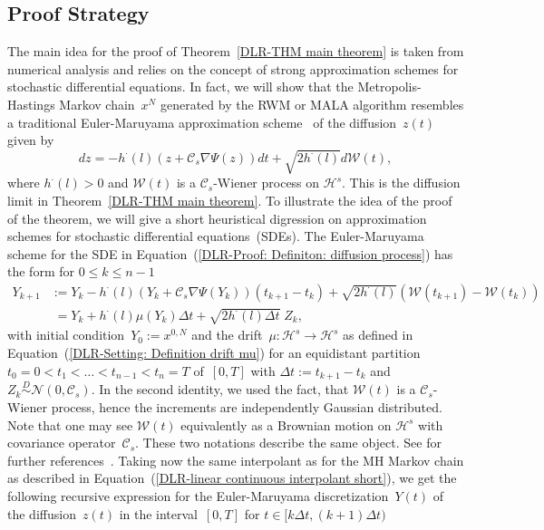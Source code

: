 \subsection{Proof Strategy}
\label{sec:sub:DLR-Proof strategy}


The main idea for the proof of Theorem~\ref{DLR-THM main theorem} is taken from numerical analysis and relies on the concept of strong approximation schemes for stochastic differential equations. In fact, we will show that the Metropolis-Hastings Markov chain~$x^N$ generated by the RWM or MALA algorithm resembles a traditional Euler-Maruyama approximation scheme~\autocite{Kloeden1992} of the diffusion~$z(t)$ given by
 \begin{equation}
 \label{DLR-Proof: Definiton: diffusion process}
  dz = -h^{\cdot}(l) (z + \mathcal{C}_s \nabla \Psi(z)) dt + \sqrt{2 h^{\cdot}(l)} d\mathcal{W}(t),
 \end{equation}
where $h^{\cdot}(l) > 0$ and $\mathcal{W}(t)$ is a $\mathcal{C}_s$-Wiener process on $\mathcal{H}^s$. This is the diffusion limit in Theorem~\ref{DLR-THM main theorem}. To illustrate the idea of the proof of the theorem, we will give a short heuristical digression on approximation schemes for stochastic differential equations~(SDEs). The Euler-Maruyama scheme for the SDE in Equation~(\ref{DLR-Proof: Definiton: diffusion process}) has the form for $0 \leq k \leq n-1$
\begin{equation}
\label{DLR-Proof: Definition Euler-Maruyama scheme of limit SDE}
\begin{split}
  Y_{k+1} & := Y_k - h^{\cdot}(l) (Y_k + \mathcal{C}_s \nabla \Psi(Y_k)) (t_{k+1} - t_k) + \sqrt{2 h^{\cdot}(l)} (\mathcal{W}(t_{k+1}) - \mathcal{W}({t_k})) \\
  & \; = Y_k + h^{\cdot}(l) \mu(Y_k) \Delta t + \sqrt{2 h^{\cdot}(l) \Delta t} \; Z_k,
\end{split}
\end{equation}
with initial condition~$Y_0 := x^{0,N}$ and the drift~$\mu: \mathcal{H}^s \to \mathcal{H}^s$ as defined in Equation~(\ref{DLR-Setting: Definition drift mu}) for an equidistant partition~$t_0 =0 < t_1 < \dots < t_{n-1} < t_n = T $ of~$[0,T]$ with $\Delta t := t_{k+1} - t_k$ and $Z_k \stackrel{D}{\sim} \mathcal{N}(0, \mathcal{C}_s)$. In the second identity, we used the fact, that $\mathcal{W}(t)$ is a $\mathcal{C}_s$-Wiener process, hence the increments are independently Gaussian distributed. Note that one may see $\mathcal{W}(t)$ equivalently as a Brownian motion on $\mathcal{H}^s$ with covariance operator~$\mathcal{C}_s$. These two notations describe the same object. See for further references~\autocite{DaPrato1992, DaPrato2002}. Taking now the same interpolant as for the MH Markov chain as described in Equation~(\ref{DLR-linear continuous interpolant short}), we get the following recursive expression for the Euler-Maruyama discretization~$Y(t)$ of the diffusion~$z(t)$ in the interval~$[0,T]$ for $t \in [k \Delta t, (k+1) \Delta t)$

